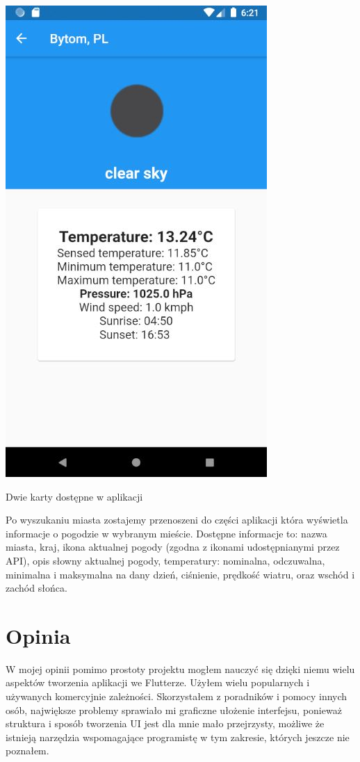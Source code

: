 \documentclass[12pt,a4paper]{article}
\begin{document}
\begin{center}
        \includegraphics{2.JPG}
            \begin{scriptsize}
           Dwie karty dostępne w aplikacji
            \end{scriptsize}
    \end{center}
    Po wyszukaniu miasta zostajemy przenoszeni do części aplikacji która wyświetla informacje o pogodzie w wybranym mieście. Dostępne informacje to: nazwa miasta, kraj, ikona aktualnej pogody (zgodna z ikonami udostępnianymi przez API), opis słowny aktualnej pogody, temperatury: nominalna, odczuwalna, minimalna i maksymalna na dany dzień, ciśnienie, prędkość wiatru, oraz wschód i zachód słońca.
	\section{Opinia}
W mojej opinii pomimo prostoty projektu mogłem nauczyć się dzięki niemu wielu aspektów tworzenia aplikacji we Flutterze. Użyłem wielu popularnych i używanych komercyjnie zależności. Skorzystałem z poradników i pomocy innych osób, największe problemy sprawiało mi graficzne ułożenie interfejsu, ponieważ struktura i sposób tworzenia UI jest dla mnie mało przejrzysty, możliwe że istnieją narzędzia wspomagające programistę w tym zakresie, których jeszcze nie poznałem.
\end{document}
